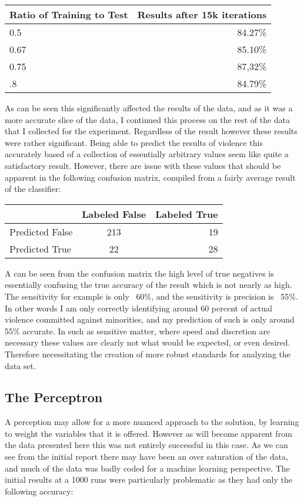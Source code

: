 \documentclass[12pt]{article}
\begin{document}
\begin{center}
\begin{tabular}{l|r}
Ratio of Training to Test & Results after 15k iterations\\
\hline
0.5  & 84.27\% \\
0.67 & 85.10\% \\
0.75 & 87,32\% \\
.8   & 84.79\%
\end{tabular}
\end{center}

	As can be seen this significantly affected the results of the data, and as it was a more accurate slice of the data, I continued this process on the rest of the data that I collected for the experiment. Regardless of the result however these results were rather significant. Being able to predict the results of violence this accurately based of a collection of essentially arbitrary values seem like quite a satisfactory result. However, there are issue with these values that should be apparent in the following confusion matrix, compiled from a fairly average result of the classifier:

\begin{center}
\begin{tabular}{l|c|r}
 & Labeled False & Labeled True\\
\hline
Predicted False & 213 & 19 \\
Predicted True & 22 & 28
\end{tabular}
\end{center}

	A can be seen from the confusion matrix the high level of true negatives is essentially confusing the true accuracy of the result which is not nearly as high. The sensitivity for example is only ~60\%, and the sensitivity is precision is ~55\%. In other words I am only correctly identifying around 60 percent of actual violence committed against minorities, and my prediction of such is only around 55\% accurate. In such as sensitive matter, where speed and discretion are necessary these values are clearly not what would be expected, or even desired. Therefore necessitating the creation of more robust standards for analyzing the data set.

\subsection{The Perceptron}
	A perception may allow for a more nuanced approach to the solution, by learning to weight the variables that it is offered. However as will become apparent from the data presented here this was not entirely successful in this case. As we can see from the initial report there may have been an over saturation of the data, and much of the data was badly coded for a machine learning perspective. The initial results at a 1000 runs were particularly problematic as they had only the following accuracy:
\end{document}
